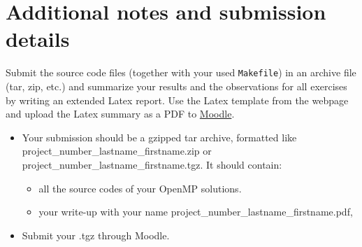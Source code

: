 \documentclass[unicode,11pt,a4paper,oneside,numbers=endperiod,openany]{scrartcl}
\begin{document}
\section*{Additional notes and submission details}
Submit the source code files (together with your used \texttt{Makefile}) in
an archive file (tar, zip, etc.) and summarize your results and the
observations for all exercises by writing an extended Latex report.
Use the Latex template from the webpage and upload the Latex summary
as a PDF to \href{https://moodle-app2.let.ethz.ch/course/view.php?id=14316}{Moodle}.

\begin{itemize}
\item Your submission should be a gzipped tar archive, formatted like project\_number\_lastname\_firstname.zip or project\_number\_lastname\_firstname.tgz. 
      It should contain:
  \begin{itemize}
    \item all the source codes of your OpenMP solutions.
    \item your write-up with your name  project\_number\_lastname\_firstname.pdf, 
  \end{itemize}
   \item Submit your .tgz through Moodle.
  \end{itemize}
\end{document}
